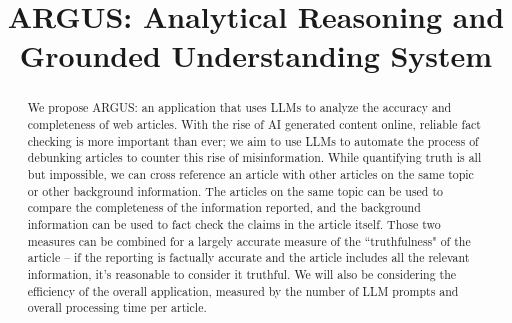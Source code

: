 \documentclass[conference]{IEEEtran}
\begin{document}
\title{ARGUS: Analytical Reasoning and Grounded Understanding System}

\author{

}

\maketitle

\begin{abstract}
We propose ARGUS: an application that uses LLMs to analyze the accuracy and completeness of web articles. With the rise of AI generated content online, reliable fact checking is more important than ever; we aim to use LLMs to automate the process of debunking articles to counter this rise of misinformation. While quantifying truth is all but impossible, we can cross reference an article with other articles on the same topic or other background information. The articles on the same topic can be used to compare the completeness of the information reported, and the background information can be used to fact check the claims in the article itself. Those two measures can be combined for a largely accurate measure of the ``truthfulness" of the article -- if the reporting is factually accurate and the article includes all the relevant information, it's reasonable to consider it truthful. We will also be considering the efficiency of the overall application, measured by the number of LLM prompts and overall processing time per article.
\end{abstract}
\end{document}
